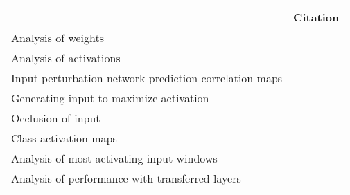 \begin{tabular}{ll}
\toprule
{} &                                                                                                                                                                                          Citation \\
\midrule
Analysis of weights                                    &  \cite{Perez-Benitez2018, Yoon2018, Langkvist2018, Deiss2018, Lawhern2018, Xu2016, Tsinalis2016a, Nurse2016, Tabar2016a, Zheng2015, Stober2015, Manor2015, Yang2015a, Langkvist2012, Cecotti2011} \\
Analysis of activations                                &                                                                                           \cite{Yuan2018a, Waytowich2018, Lawhern2018, kwak2017, Yin2017a, Supratak2017, Shamwell2016, Manor2015} \\
Input-perturbation network-prediction correlation maps &                                                                                                              \cite{Schirrmeister2017a, Volker2018, Hartmann2018b, Behncke2017, Schirrmeister2017} \\
Generating input to maximize activation                &                                                                                                                                      \cite{VanPutten2018b, Ruffini2018a, Sors2018, Bashivan2016a} \\
Occlusion of input                                     &                                                                                                                                                        \cite{Lee2018, Chambon2018, Thodoroff2016} \\
Class activation maps                                  &                                                                                                                                                                                  \cite{Ghosh2018} \\
Analysis of most-activating input windows              &                                                                                                                                                                              \cite{Hartmann2018b} \\
Analysis of performance with transferred layers        &                                                                                                                                                                            \cite{Hajinoroozi2017} \\

\end{tabular}
